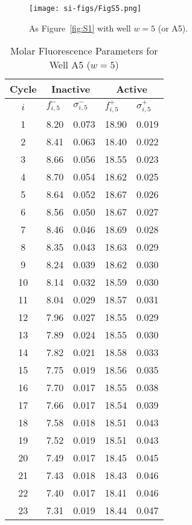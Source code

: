                 \begin{figure}
                    \centering
                    \texttt{[image: si-figs/FigS5.png]}
                    \caption{
                        As Figure~\ref{fig:S1} with well $w=5$ (or A5).
                    }
                \end{figure}
                \clearpage
    \begin{table}
        \caption{Molar Fluorescence Parameters for Well A5 ($w=5$)}
        \centering
        \begin{tabular}{c|ll|ll}
            Cycle & \multicolumn{2}{c|}{Inactive} & \multicolumn{2}{c}{Active} \\
            \hline
            $i$ & $f_{i,5}^{-}$ & $\sigma_{i,5}^{-}$ &  $f_{i,5}^{+}$ & $\sigma_{i,5}^{+}$ \\
            \hline
    1 & 8.20 & 0.073 & 18.90 & 0.019 \\
2 & 8.41 & 0.063 & 18.40 & 0.022 \\
3 & 8.66 & 0.056 & 18.55 & 0.023 \\
4 & 8.70 & 0.054 & 18.62 & 0.025 \\
5 & 8.64 & 0.052 & 18.67 & 0.026 \\
6 & 8.56 & 0.050 & 18.67 & 0.027 \\
7 & 8.46 & 0.046 & 18.69 & 0.028 \\
8 & 8.35 & 0.043 & 18.63 & 0.029 \\
9 & 8.24 & 0.039 & 18.62 & 0.030 \\
10 & 8.14 & 0.032 & 18.59 & 0.030 \\
11 & 8.04 & 0.029 & 18.57 & 0.031 \\
12 & 7.96 & 0.027 & 18.55 & 0.029 \\
13 & 7.89 & 0.024 & 18.55 & 0.030 \\
14 & 7.82 & 0.021 & 18.58 & 0.033 \\
15 & 7.75 & 0.019 & 18.56 & 0.035 \\
16 & 7.70 & 0.017 & 18.55 & 0.038 \\
17 & 7.66 & 0.017 & 18.54 & 0.039 \\
18 & 7.58 & 0.018 & 18.51 & 0.043 \\
19 & 7.52 & 0.019 & 18.51 & 0.043 \\
20 & 7.49 & 0.017 & 18.45 & 0.045 \\
21 & 7.43 & 0.018 & 18.43 & 0.046 \\
22 & 7.40 & 0.017 & 18.41 & 0.046 \\
23 & 7.31 & 0.019 & 18.44 & 0.047 \\

\end{tabular}
\end{table}
